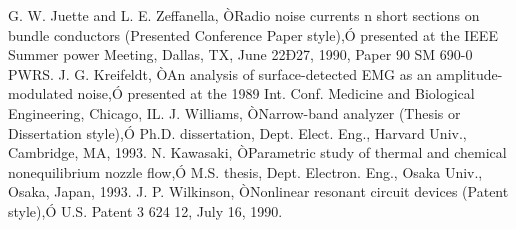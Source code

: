 \documentclass[a4paper, 10pt, conference]{ieeeconf}      %
\begin{document}
\begin{thebibliography}{99}
 G. W. Juette and L. E. Zeffanella, ÒRadio noise currents n short sections on bundle conductors (Presented Conference Paper style),Ó presented at the IEEE Summer power Meeting, Dallas, TX, June 22Ð27, 1990, Paper 90 SM 690-0 PWRS.
 J. G. Kreifeldt, ÒAn analysis of surface-detected EMG as an amplitude-modulated noise,Ó presented at the 1989 Int. Conf. Medicine and Biological Engineering, Chicago, IL.
 J. Williams, ÒNarrow-band analyzer (Thesis or Dissertation style),Ó Ph.D. dissertation, Dept. Elect. Eng., Harvard Univ., Cambridge, MA, 1993. 
 N. Kawasaki, ÒParametric study of thermal and chemical nonequilibrium nozzle flow,Ó M.S. thesis, Dept. Electron. Eng., Osaka Univ., Osaka, Japan, 1993.
 J. P. Wilkinson, ÒNonlinear resonant circuit devices (Patent style),Ó U.S. Patent 3 624 12, July 16, 1990. 






\end{thebibliography}
\end{document}
